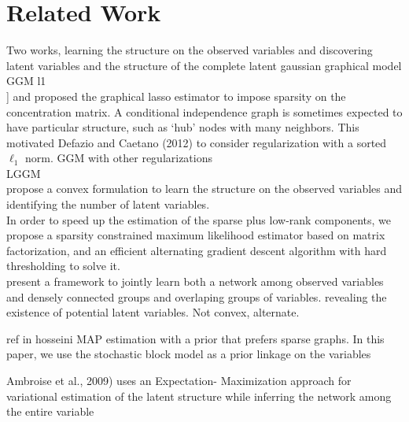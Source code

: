 \section{Related Work}
\label{related}
Two works, learning the structure on the observed variables and discovering latent variables and the structure of the complete latent gaussian graphical model
GGM l1\\
\citet{yuan2007model}] and \citet{banerjee2008model} proposed the graphical lasso estimator to impose sparsity on the concentration matrix.
A conditional independence graph is sometimes expected to have particular structure, such as ‘hub’ nodes with many neighbors. This motivated Defazio and Caetano (2012) to consider regularization with a sorted $\ell_1$ norm.
GGM with other regularizations\\
LGGM\\
\citet{chandrasekaran2010} propose a convex formulation to learn the structure on the observed variables and identifying the number of latent variables. \\
\citet{xu2017speeding}  In order to speed
up the estimation of the sparse plus low-rank components, we propose a sparsity constrained maximum likelihood estimator based on matrix factorization, and an efficient alternating gradient descent algorithm with hard thresholding to solve it.\\

\citet{hosseini2016learning}  present a framework to jointly learn both a network among observed variables and densely connected groups and overlaping groups of variables. revealing the existence of potential latent variables. Not convex, alternate.


ref in hosseini
\citet{marlin2009sparse} MAP estimation with a prior that prefers sparse graphs. In this paper, we use the stochastic block model as a prior
\citet{tan2015cluster} linkage on the variables

\citet{celik2014efficient}

Ambroise et al., 2009) uses an Expectation-
Maximization approach for variational estimation of the latent structure while inferring the network among the entire variable